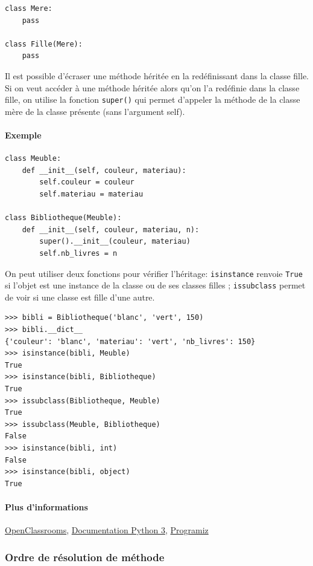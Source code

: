 \documentclass[a4paper, 10pt]{article}
\begin{document}
\begin{verbatim}
class Mere:
    pass

class Fille(Mere):
    pass
\end{verbatim}

Il est possible d'écraser une méthode héritée en la redéfinissant dans la classe fille. Si on veut accéder à une méthode héritée alors qu'on l'a redéfinie dans la classe fille, on utilise la fonction \texttt{super()} qui permet d'appeler la méthode de la classe mère de la classe présente (sans l'argument self).

\paragraph{Exemple}
\begin{verbatim}
class Meuble:
    def __init__(self, couleur, materiau):
        self.couleur = couleur
        self.materiau = materiau

class Bibliotheque(Meuble):
    def __init__(self, couleur, materiau, n):
        super().__init__(couleur, materiau)
        self.nb_livres = n
\end{verbatim}
On peut utiliser deux fonctions pour vérifier l'héritage: \texttt{isinstance} renvoie \texttt{True} si l'objet est une instance de la classe ou de ses classes filles ; \texttt{issubclass} permet de voir si une classe est fille d'une autre.

\begin{verbatim}
>>> bibli = Bibliotheque('blanc', 'vert', 150)
>>> bibli.__dict__
{'couleur': 'blanc', 'materiau': 'vert', 'nb_livres': 150}
>>> isinstance(bibli, Meuble)
True
>>> isinstance(bibli, Bibliotheque)
True
>>> issubclass(Bibliotheque, Meuble)
True
>>> issubclass(Meuble, Bibliotheque)
False
>>> isinstance(bibli, int)
False
>>> isinstance(bibli, object)
True
\end{verbatim}

\paragraph{Plus d'informations} \href{https://openclassrooms.com/courses/apprenez-a-programmer-en-python/l-heritage-9}{OpenClassrooms}, \href{https://docs.python.org/fr/3/tutorial/classes.html?highlight=héritage#inheritance}{Documentation Python 3}, \href{https://www.programiz.com/python-programming/inheritance}{Programiz}


\subsubsection{Ordre de résolution de méthode}
\end{document}
